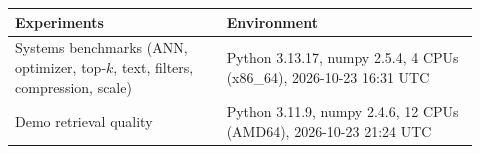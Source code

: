 \begin{tabular}{p{0.42\linewidth}p{0.5\linewidth}}
\toprule
Experiments & Environment \\
\midrule
Systems benchmarks (ANN, optimizer, top-$k$, text, filters, compression, scale) & Python 3.13.17, numpy 2.5.4, 4 CPUs (x86\_64), 2026-10-23 16:31 UTC \\
Demo retrieval quality & Python 3.11.9, numpy 2.4.6, 12 CPUs (AMD64), 2026-10-23 21:24 UTC \\
\bottomrule
\end{tabular}
